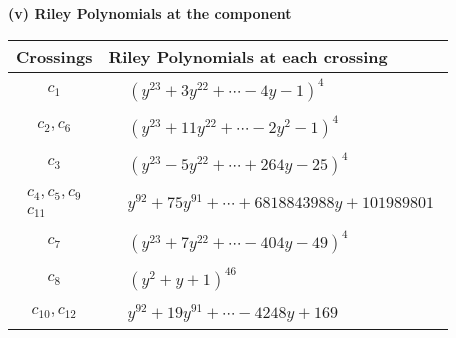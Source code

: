 \documentclass[1p]{elsarticle_modified}
\theoremstyle{definition}
\begin{document}
\newpage\renewcommand{\arraystretch}{1}
\flushleft \textbf{(v) Riley Polynomials at the component}\newline \\
\begin{tabular}{m{50pt}|m{274pt}}
Crossings & \hspace{64pt}Riley Polynomials at each crossing \\
\hline $$\begin{aligned}c_{1}\end{aligned}$$&$\begin{aligned}
&(y^{23}+3 y^{22}+\cdots-4 y-1)^{4}
\end{aligned}$\\
\hline $$\begin{aligned}c_{2},c_{6}\end{aligned}$$&$\begin{aligned}
&(y^{23}+11 y^{22}+\cdots-2 y^2-1)^{4}
\end{aligned}$\\
\hline $$\begin{aligned}c_{3}\end{aligned}$$&$\begin{aligned}
&(y^{23}-5 y^{22}+\cdots+264 y-25)^{4}
\end{aligned}$\\
\hline $$\begin{aligned}c_{4},c_{5},c_{9}\\c_{11}\end{aligned}$$&$\begin{aligned}
&y^{92}+75 y^{91}+\cdots+6818843988 y+101989801
\end{aligned}$\\
\hline $$\begin{aligned}c_{7}\end{aligned}$$&$\begin{aligned}
&(y^{23}+7 y^{22}+\cdots-404 y-49)^{4}
\end{aligned}$\\
\hline $$\begin{aligned}c_{8}\end{aligned}$$&$\begin{aligned}
&(y^2+y+1)^{46}
\end{aligned}$\\
\hline $$\begin{aligned}c_{10},c_{12}\end{aligned}$$&$\begin{aligned}
&y^{92}+19 y^{91}+\cdots-4248 y+169
\end{aligned}$\\
\hline
\end{tabular}\\~\\
\end{document}
